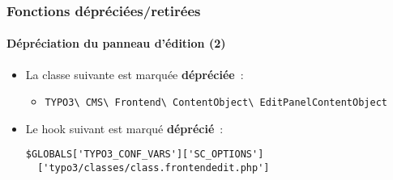 %

\begin{frame}[fragile]
	\frametitle{Fonctions dépréciées/retirées}
	\framesubtitle{Dépréciation du panneau d'édition (2)}


	\begin{itemize}
		\item La classe suivante est marquée \textbf{dépréciée}~:
			\begin{itemize}\smaller
				\item \texttt{TYPO3\textbackslash
					CMS\textbackslash
					Frontend\textbackslash
					ContentObject\textbackslash
					EditPanelContentObject}
			\end{itemize}\normalsize
		\item Le hook suivant est marqué \textbf{déprécié}~:
\begin{lstlisting}
$GLOBALS['TYPO3_CONF_VARS']['SC_OPTIONS']
  ['typo3/classes/class.frontendedit.php']
\end{lstlisting}

	\end{itemize}

\end{frame}

